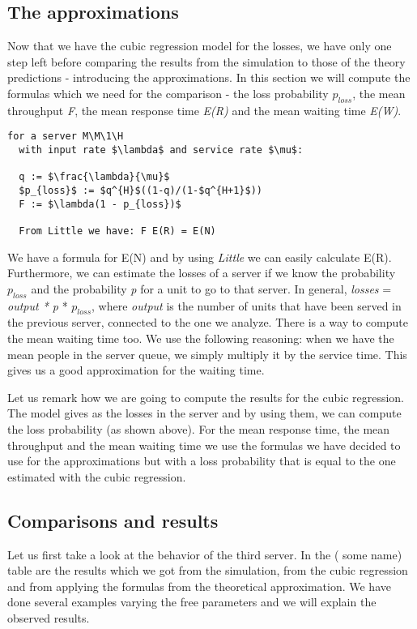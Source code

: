 \documentclass[12pt]{article}
\theoremstyle{plain}
\begin{document}
\subsection*{The approximations}

Now that we have the cubic regression model for the losses, we have only one
step left before comparing the results from the simulation to those of the
theory predictions - introducing the approximations. In this section we will
compute the formulas which we need for the comparison - the loss probability
$p_{loss}$, the mean throughput \emph{F}, the mean response time \emph{E(R)}
and the mean waiting time \emph{E(W)}.

\begin{lstlisting}[frame=single]
  for a server M\M\1\H
  with input rate $\lambda$ and service rate $\mu$:

  q := $\frac{\lambda}{\mu}$
  $p_{loss}$ := $q^{H}$((1-q)/(1-$q^{H+1}$))
  F := $\lambda(1 - p_{loss})$
  
  From Little we have: F E(R) = E(N)
\end{lstlisting}

We have a formula for E(N) and by using \emph{Little} we can easily calculate
E(R). Furthermore, we can estimate the losses of a server if we know the
probability $p_{loss}$ and the probability \emph{p} for a unit to go to that
server. In general, \emph{losses} = \emph{output * p} * $p_{loss}$, where
\emph{output} is the number of units that have been served in the previous
server, connected to the one we analyze. There is a way to compute the mean
waiting time too. We use the following reasoning: when we have the mean people
in the server queue, we simply multiply it by the service time. This gives us a
good approximation for the waiting time.

Let us remark how we are going to compute the results for the cubic regression.
The model gives as the losses in the server and by using them, we can compute
the loss probability (as shown above). For the mean response time, the mean
throughput and the mean waiting time we use the formulas we have decided to use
for the approximations but with a loss probability that is equal to the one
estimated with the cubic regression.

\subsection*{Comparisons and results}

Let us first take a look at the behavior of the third server. In the
({\color{red} some name}) table are the results which we got from the
simulation, from the cubic regression and from applying the formulas from the
theoretical approximation. We have done several examples varying the free
parameters and we will explain the observed results.  
\end{document}
